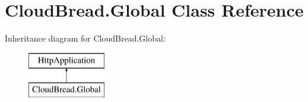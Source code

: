 \hypertarget{class_cloud_bread_1_1_global}{}\section{Cloud\+Bread.\+Global Class Reference}
\label{class_cloud_bread_1_1_global}
Inheritance diagram for Cloud\+Bread.\+Global\+:\begin{figure}[H]
\begin{center}
\leavevmode
\includegraphics[height=2.000000cm]{class_cloud_bread_1_1_global}
\end{center}
\end{figure}

